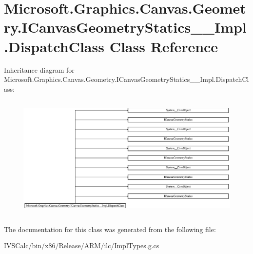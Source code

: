 \hypertarget{class_microsoft_1_1_graphics_1_1_canvas_1_1_geometry_1_1_i_canvas_geometry_statics_____impl_1_1_dispatch_class}{}\section{Microsoft.\+Graphics.\+Canvas.\+Geometry.\+I\+Canvas\+Geometry\+Statics\+\_\+\+\_\+\+Impl.\+Dispatch\+Class Class Reference}
\label{class_microsoft_1_1_graphics_1_1_canvas_1_1_geometry_1_1_i_canvas_geometry_statics_____impl_1_1_dispatch_class}
Inheritance diagram for Microsoft.\+Graphics.\+Canvas.\+Geometry.\+I\+Canvas\+Geometry\+Statics\+\_\+\+\_\+\+Impl.\+Dispatch\+Class\+:\begin{figure}[H]
\begin{center}
\leavevmode
\includegraphics[height=6.234818cm]{class_microsoft_1_1_graphics_1_1_canvas_1_1_geometry_1_1_i_canvas_geometry_statics_____impl_1_1_dispatch_class}
\end{center}
\end{figure}


The documentation for this class was generated from the following file\+:\begin{DoxyCompactItemize}
\item 
I\+V\+S\+Calc/bin/x86/\+Release/\+A\+R\+M/ilc/Impl\+Types.\+g.\+cs\end{DoxyCompactItemize}
